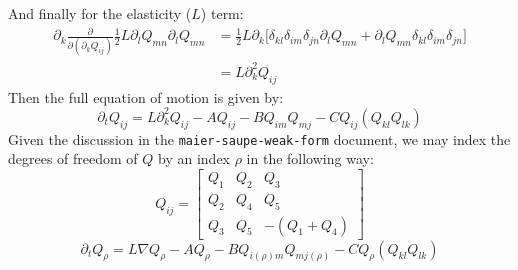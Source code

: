 \documentclass[reqno]{article}
\begin{document}
	And finally for the elasticity ($L$) term:
	\begin{equation}
	\begin{split}
		\partial_k \frac{\partial}{\partial (\partial_k Q_{ij})}
		\tfrac12 L \partial_l Q_{mn} \partial_l Q_{mn}
		&= \tfrac12 L \partial_k \bigl[
		\delta_{kl} \delta_{im} \delta_{jn} \partial_l Q_{mn}
		+ \partial_l Q_{mn} \delta_{kl} \delta_{im} \delta_{jn}
		\bigr] \\
		&= L \partial_k^2 Q_{ij}
	\end{split}
	\end{equation}
	Then the full equation of motion is given by:
	\begin{equation}
		\partial_t Q_{ij}
		= L \partial_k^2 Q_{ij}
		- A Q_{ij}
		- B Q_{im} Q_{mj}
		- C Q_{ij} (Q_{kl} Q_{lk})
	\end{equation}
	Given the discussion in the \verb|maier-saupe-weak-form| document, we may index the degrees of freedom of $Q$ by an index $\rho$ in the following way:
	\begin{equation}
		Q_{ij}
		=
		\begin{bmatrix}
		Q_1 & Q_2 & Q_3 \\
		Q_2 & Q_4 & Q_5 \\
		Q_3 & Q_5 & -(Q_1 + Q_4)
		\end{bmatrix}
	\end{equation}
	\begin{equation}
		\partial_t Q_\rho
		= L \nabla Q_\rho
		- A Q_\rho
		- B Q_{i(\rho) m} Q_{m j(\rho)}
		- C Q_\rho (Q_{kl} Q_{lk})
	\end{equation}
	
\end{document}
